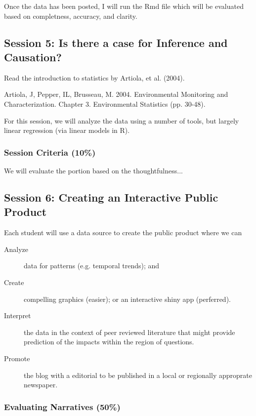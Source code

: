 \documentclass{article}\usepackage[]{graphicx}\usepackage[]{color}
\newenvironment{itemize*}%
  {\begin{itemize}%
    \setlength{\itemsep}{0pt}%
    \setlength{\parskip}{0pt}}%
  {\end{itemize}}
\begin{document}
Once the data has been posted, I will run the Rmd file which will be evaluated based on completness, accuracy, and clarity.  

\subsection{Session 5: Is there a case for Inference and Causation?}

Read the introduction to statistics by Artiola, et al. (2004). 

  \begin{itemize*}
  		\item Artiola, J, Pepper, IL, Brusseau, M. 2004. Environmental Monitoring and Characterization. Chapter 3. Environmental Statistics (pp. 30-48).
\end{itemize*}

For this session, we will analyze the data using a number of tools, but largely linear regression (via linear models in R). 

\subsubsection{Session Criteria (10\%)}

We will evaluate the portion based on the thoughtfulness...

\subsection{Session 6: Creating an Interactive Public Product}

Each student will use a data source to create the public product where we can 
\begin{description}
  \item[Analyze] data for patterns (e.g. temporal trends); and
  \item[Create] compelling graphics (easier); or an interactive shiny app (perferred).
  \item[Interpret] the data in the context of peer reviewed literature that might provide prediction of the impacts within the region of questions.
  \item[Promote] the blog with a editorial to be published in a local or regionally approprate newspaper.
\end{description}

\subsubsection{Evaluating Narratives (50\%)}
\end{document}
